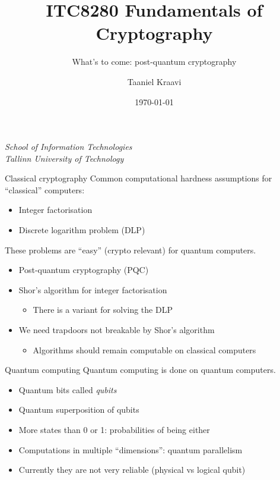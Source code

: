 \usetikzlibrary{positioning,calc,external,arrows.meta}

\title{ITC8280 Fundamentals of Cryptography}
\subtitle{What's to come: post-quantum cryptography}
\date{\today}
\author{Taaniel Kraavi}
\institute%
{%
  \textit{School of Information Technologies}\\
  \textit{Tallinn University of Technology}
}


\begin{frame}
  \titlepage
\end{frame}

\begin{frame}{Classical cryptography}
  Common computational hardness assumptions for \enquote{classical} computers:
  \begin{itemize}[<+(1)->]
    \item Integer factorisation
    \item Discrete logarithm problem (DLP)
  \end{itemize}

  \vspace*{1em}

  \pause
  These problems are \enquote{easy} (crypto relevant) for quantum computers.
  \begin{itemize}[<+(1)->]
    \item Post-quantum cryptography (PQC)
    \item Shor's algorithm for integer factorisation
    \begin{itemize}
      \item There is a variant for solving the DLP
    \end{itemize}
    \item We need trapdoors not breakable by Shor's algorithm
    \begin{itemize}
      \item Algorithms should remain computable on classical computers
    \end{itemize}
  \end{itemize}
\end{frame}

\begin{frame}{Quantum computing}
  Quantum computing is done on quantum computers.
  \begin{itemize}[<+(1)->]
    \item Quantum bits called \emph{qubits}
    \item Quantum superposition of qubits
    \item More states than 0 or 1: probabilities of being either
    \item Computations in multiple \enquote{dimensions}: quantum parallelism
    \item Currently they are not very reliable (physical vs logical qubit)
  \end{itemize}
\end{frame}

